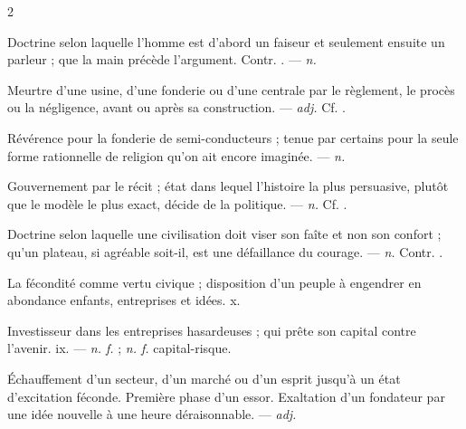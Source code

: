\begin{multicols}{2}

 Doctrine selon laquelle l'homme est d'abord un faiseur et seulement ensuite un parleur ; que la main précède l'argument. Contr. . —  \textit{n.}

 Meurtre d'une usine, d'une fonderie ou d'une centrale par le règlement, le procès ou la négligence, avant ou après sa construction. —  \textit{adj.} Cf. .

 Révérence pour la fonderie de semi-conducteurs ; tenue par certains pour la seule forme rationnelle de religion qu'on ait encore imaginée.   —  \textit{n.}

 Gouvernement par le récit ; état dans lequel l'histoire la plus persuasive, plutôt que le modèle le plus exact, décide de la politique.  —  \textit{n.} Cf. .

 Doctrine selon laquelle une civilisation doit viser son faîte et non son confort ; qu'un plateau, si agréable soit-il, est une défaillance du courage. —  \textit{n.} Contr. .

 La fécondité comme vertu civique ; disposition d'un peuple à engendrer en abondance enfants, entreprises et idées.   x.

 Investisseur dans les entreprises hasardeuses ; qui prête son capital contre l'avenir.   ix. —  \textit{n. f.} ;  \textit{n. f.} capital-risque.

 Échauffement d'un secteur, d'un marché ou d'un esprit jusqu'à un état d'excitation féconde.  Première phase d'un essor.  Exaltation d'un fondateur par une idée nouvelle à une heure déraisonnable. —  \textit{adj.}


\end{multicols}
